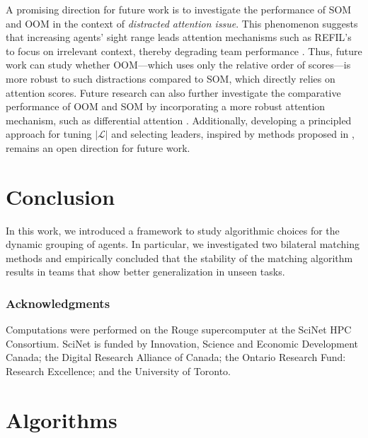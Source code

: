 \documentclass[10pt]{article} %
\begin{document}
A promising direction for future work is to investigate the performance of SOM and OOM in the context of \textit{distracted attention issue}. This phenomenon suggests that increasing agents’ sight range leads attention mechanisms such as REFIL’s to focus on irrelevant context, thereby degrading team performance \citep{shao2023complementary}. Thus, future work can study whether OOM—which uses only the relative order of scores—is more robust to such distractions compared to SOM, which directly relies on attention scores.
Future research can also further investigate the comparative performance of OOM and SOM by incorporating a more robust attention mechanism, such as differential attention \citep{ye2024differential}. Additionally, developing a principled approach for tuning $|\mathcal{L}|$ and selecting leaders, inspired by methods proposed in \citep{shao2022self}, remains an open direction for future work.

\section{Conclusion}

In this work, we introduced a framework to study algorithmic choices for the dynamic grouping of agents. In particular, we investigated two bilateral matching methods and empirically concluded that the stability of the matching algorithm results in teams that show better generalization in unseen tasks.


\subsubsection*{Acknowledgments}
\label{sec:ack}
Computations were performed on the Rouge supercomputer at the SciNet HPC Consortium. SciNet is funded by Innovation, Science and Economic Development Canada; the Digital Research Alliance of Canada; the Ontario Research Fund: Research Excellence; and the University of Toronto.

\appendix

\section{Algorithms}
\label{sec:appendix1}
\end{document}
